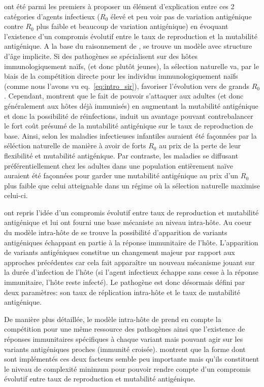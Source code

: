 \citet{Frank2007} ont été parmi les premiers à proposer un élément
d'explication entre ces 2 catégories d'agents infectieux ($R_0$ élevé
et peu voir pas de variation antigénique contre $R_0$ plus faible et
beaucoup de variation antigénique) en évoquant l'existence d'un
compromis évolutif entre le taux de reproduction et la mutabilité
antigénique. A la base du raisonnement de \citet{Frank2007}, se trouve
un modèle avec structure d'âge implicite. Si des pathogènes se
spécialisent sur des hôtes immunologiquement naïfs, (et donc plutôt
jeunes), la sélection naturelle va, par le biais de la compétition
directe pour les individus immunologiquement naïfs (comme nous l'avons
vu eq.~\eqref{eq:intro_sir}), favoriser l'évolution vers de grands
$R_0$. Cependant, \citet{Frank2007} montrent que le fait de pouvoir
s'attaquer aux adultes (et donc généralement aux hôtes déjà immunisés)
en augmentant la mutabilité antigénique et donc la possibilité de
réinfections, induit un avantage pouvant contrebalancer le fort coût
présumé de la mutabilité antigénique sur le taux de reproduction de
base. Ainsi, selon \citet{Frank2007} les maladies infectieuses
infantiles auraient été façonnées par la séléction naturelle de
manière à avoir de forts $R_0$ au prix de la perte de leur flexibilité
et mutabilité antigénique. Par contraste, les maladies se diffusant
préférentiellement chez les adultes dans une population entièrement
naïve auraient été façonnées pour garder une mutabilité antigénique au
prix d'un $R_0$ plus faible que celui atteignable dans un régime où la
sélection naturelle maximise celui-ci.

\citet{Lange2009} ont repris l'idée d'un compromis évolutif entre taux
de reproduction et mutabilité antigénique et lui ont fourni une base
mécaniste au niveau intra-hôte. Au coeur du modèle intra-hôte de
\citet{Lange2009} se trouve la possibilité d'apparition de variants
antigéniques échappant en partie à la réponse immunitaire de l'hôte.
L'apparition de variants antigéniques constitue un changement majeur
par rapport aux approches précédentes car cela fait apparaître un
nouveau mécanisme jouant sur la durée d'infection de l'hôte (si
l'agent infectieux échappe sans cesse à la réponse immunitaire, l'hôte
reste infecté). Le pathogène est donc désormais défini par deux
paramètres: son taux de réplication intra-hôte et le taux de
mutabilité antigénique.

De manière plus détaillée, le modèle intra-hôte de \citet{Lange2009}
prend en compte la compétition pour une même ressource des pathogènes
ainsi que l'existence de réponses immunitaires spécifiques à chaque
variant mais pouvant agir sur les variants antigéniques proches
(immunité croisée). \citet{Lange2009} montrent que la forme dont sont
implémentés ces deux facteurs semble peu importante mais qu'ils
constituent le niveau de complexité minimum pour pouvoir rendre compte
d'un compromis évolutif entre taux de reproduction et mutabilité
antigénique.


